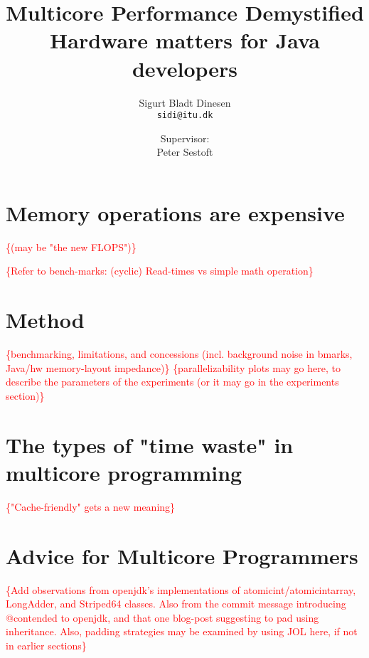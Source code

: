 \documentclass[a4paper, titlepage]{report}
\renewcommand{\%}{\protect\scalebox{.9}{\oldpct}}
\newcommand\mynote[1]{\noindent\textcolor{red}{\{#1\}}}
\begin{document}
\title{Multicore Performance Demystified\\
\hfill \break
\large Hardware matters for Java developers
}
\author{
	Sigurt Bladt Dinesen
	\\\texttt{sidi@itu.dk}
	\and
	Supervisor:
	\\Peter Sestoft
}

\maketitle
\tableofcontents
\clearpage









\chapter{Memory operations are expensive}
\mynote{(may be "the new FLOPS")}

\mynote{Refer to bench-marks: (cyclic) Read-times vs simple math operation}

\chapter{Method}
\mynote{benchmarking, limitations, and concessions (incl. background
noise in bmarks, Java/hw memory-layout impedance)}
\mynote{parallelizability plots may go here, to describe the parameters of the
experiments (or it may go in the experiments section)}

\chapter{The types of "time waste" in multicore programming}
\mynote{"Cache-friendly" gets a new meaning}



\chapter{Advice for Multicore Programmers}
\mynote{Add observations from openjdk's implementations of
atomicint/atomicintarray, LongAdder, and Striped64 classes. Also from the commit
message introducing @contended to openjdk, and that one blog-post suggesting to
pad using inheritance. Also, padding strategies may be examined by using JOL
here, if not in earlier sections}

\clearpage
\nocite{*}


\end{document}
